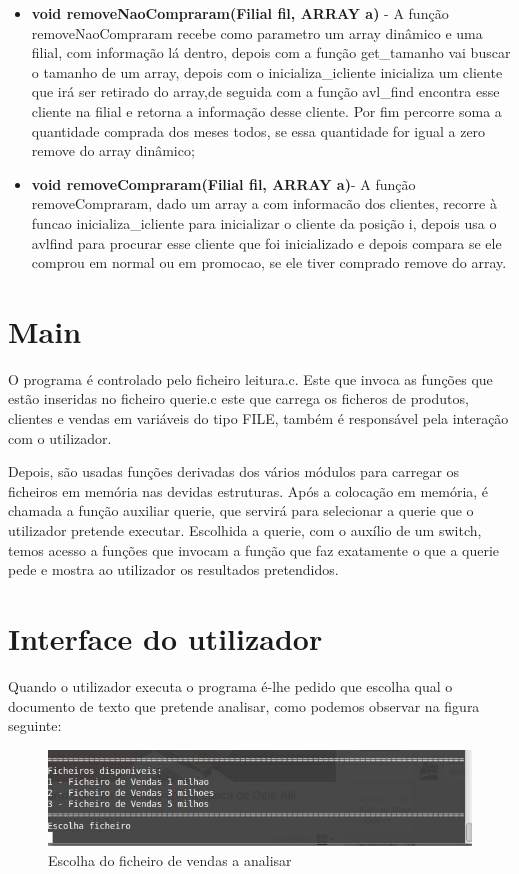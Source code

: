 \begin{itemize}
\item	\textbf{void removeNaoCompraram(Filial fil, ARRAY a)} - A função removeNaoCompraram recebe como parametro um array dinâmico e uma filial, com informação lá dentro, depois com a função get\_tamanho vai buscar o tamanho de um array, depois com o inicializa\_icliente inicializa um cliente que irá ser retirado do array,de seguida com a função avl\_find encontra esse cliente na filial e retorna a informação desse cliente. Por fim percorre soma a quantidade comprada dos meses todos, se essa quantidade for igual a zero remove do array dinâmico; 

\item	\textbf{void removeCompraram(Filial fil, ARRAY a)}- A função removeCompraram, dado um array a com informacão dos clientes, recorre à funcao inicializa\_icliente 
para inicializar o cliente da posição i, depois usa o avlfind 
para procurar esse cliente que foi inicializado e depois compara se ele comprou em normal ou em promocao, se ele tiver comprado remove do array. 
\end{itemize}


\chapter{Main}

O programa é controlado pelo ficheiro leitura.c. Este que invoca as funções que estão inseridas no ficheiro querie.c este que carrega os ficheros de produtos, clientes e vendas em variáveis do tipo FILE,  também é responsável pela interação com o utilizador.


 
Depois, são usadas funções derivadas dos vários módulos para carregar os ficheiros em memória nas devidas estruturas. Após a colocação em memória, é chamada a função auxiliar querie, que servirá para selecionar a querie que o utilizador pretende executar. Escolhida a querie, com o auxílio de um switch, temos acesso a funções que invocam a função que faz exatamente o que a querie pede e mostra ao utilizador os resultados pretendidos.


\chapter{Interface do utilizador}
Quando o utilizador executa o programa é-lhe pedido que escolha qual o documento de texto que pretende analisar, como podemos observar na figura seguinte: 

\begin{figure}[h!]
	\centering
	\includegraphics[scale=0.4]{1querie.png}  
	\caption{Escolha do ficheiro de vendas a analisar}  
\end{figure}

